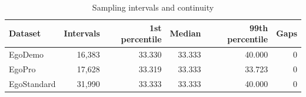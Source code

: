 \begin{table}[htbp]
\centering
\small
\caption{Sampling intervals and continuity}
\label{tab:sampling}
\setlength{\tabcolsep}{4pt}
\begin{tabular}{lrrrrr}
\toprule
Dataset & Intervals & 1st percentile & Median & 99th percentile & Gaps\\
\midrule
EgoDemo & 16,383 & 33.330 & 33.333 & 40.000 & 0\\
EgoPro & 17,628 & 33.319 & 33.333 & 33.723 & 0\\
EgoStandard & 31,990 & 33.333 & 33.333 & 40.000 & 0\\
\bottomrule
\end{tabular}
\end{table}
